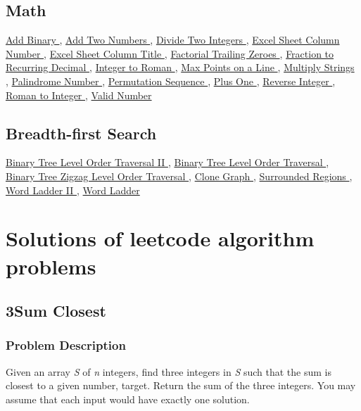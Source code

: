 \documentclass{article}
\begin{document}
\begin{CJK*}{UTF8}{gkai}
\subsection*{ Math }
\label{ Math }
\hyperref[ Add Binary ]{ Add Binary },
\hyperref[ Add Two Numbers ]{ Add Two Numbers },
\hyperref[ Divide Two Integers ]{ Divide Two Integers },
\hyperref[ Excel Sheet Column Number ]{ Excel Sheet Column Number },
\hyperref[ Excel Sheet Column Title ]{ Excel Sheet Column Title },
\hyperref[ Factorial Trailing Zeroes ]{ Factorial Trailing Zeroes },
\hyperref[ Fraction to Recurring Decimal ]{ Fraction to Recurring Decimal },
\hyperref[ Integer to Roman ]{ Integer to Roman },
\hyperref[ Max Points on a Line ]{ Max Points on a Line },
\hyperref[ Multiply Strings ]{ Multiply Strings },
\hyperref[ Palindrome Number ]{ Palindrome Number },
\hyperref[ Permutation Sequence ]{ Permutation Sequence },
\hyperref[ Plus One ]{ Plus One },
\hyperref[ Reverse Integer ]{ Reverse Integer },
\hyperref[ Roman to Integer ]{ Roman to Integer },
\hyperref[ Valid Number ]{ Valid Number }

\subsection*{ Breadth-first Search }
\label{ Breadth-first Search }
\hyperref[ Binary Tree Level Order Traversal II ]{ Binary Tree Level Order Traversal II },
\hyperref[ Binary Tree Level Order Traversal ]{ Binary Tree Level Order Traversal },
\hyperref[ Binary Tree Zigzag Level Order Traversal ]{ Binary Tree Zigzag Level Order Traversal },
\hyperref[ Clone Graph ]{ Clone Graph },
\hyperref[ Surrounded Regions ]{ Surrounded Regions },
\hyperref[ Word Ladder II ]{ Word Ladder II },
\hyperref[ Word Ladder ]{ Word Ladder }
\section{Solutions of leetcode algorithm problems}

\subsection{ 3Sum Closest }
\label{ 3Sum Closest }

\subsubsection*{Problem Description}
Given an array \emph{S} of \emph{n} integers, find three integers in \emph{S} such that the sum is closest to a given number, target. Return the sum of the three integers. You may assume that each input would have exactly one solution.


\end{CJK*}
\end{document}
